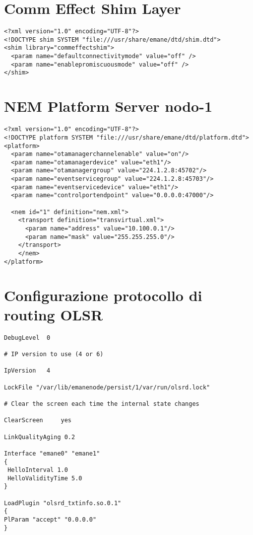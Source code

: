 \section{Comm Effect Shim Layer}
\label{app:shim_layer}

\lstset{language=XML}
\begin{lstlisting}
<?xml version="1.0" encoding="UTF-8"?>
<!DOCTYPE shim SYSTEM "file:///usr/share/emane/dtd/shim.dtd">
<shim library="commeffectshim">
  <param name="defaultconnectivitymode" value="off" />
  <param name="enablepromiscuousmode" value="off" />
</shim>
\end{lstlisting}

\section{NEM Platform Server nodo-1}
\label{app:platform_server}

\lstset{language=XML}
\begin{lstlisting}
<?xml version="1.0" encoding="UTF-8"?>
<!DOCTYPE platform SYSTEM "file:///usr/share/emane/dtd/platform.dtd">
<platform>
  <param name="otamanagerchannelenable" value="on"/>
  <param name="otamanagerdevice" value="eth1"/>
  <param name="otamanagergroup" value="224.1.2.8:45702"/>
  <param name="eventservicegroup" value="224.1.2.8:45703"/>
  <param name="eventservicedevice" value="eth1"/>
  <param name="controlportendpoint" value="0.0.0.0:47000"/>

  <nem id="1" definition="nem.xml">
    <transport definition="transvirtual.xml">
      <param name="address" value="10.100.0.1"/>
      <param name="mask" value="255.255.255.0"/>
    </transport>
    </nem>
</platform>
\end{lstlisting}

\section{Configurazione protocollo di routing OLSR}
\label{app:routing}

\lstset{language=BASH}
\begin{lstlisting}
DebugLevel	0

# IP version to use (4 or 6)

IpVersion	4

LockFile "/var/lib/emanenode/persist/1/var/run/olsrd.lock"

# Clear the screen each time the internal state changes

ClearScreen     yes

LinkQualityAging 0.2

Interface "emane0" "emane1"
{
 HelloInterval 1.0
 HelloValidityTime 5.0
}

LoadPlugin "olsrd_txtinfo.so.0.1"
{
PlParam "accept" "0.0.0.0"
}
\end{lstlisting}

